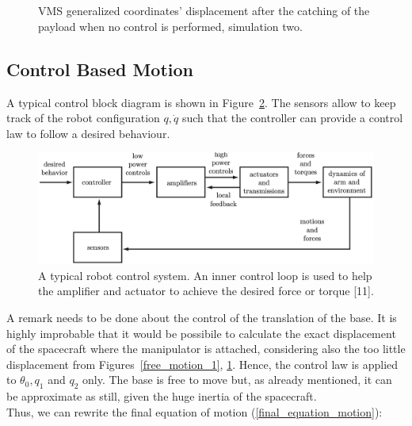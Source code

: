 \documentclass[a4paper,12pt,oneside]{report}
\begin{document}
\begin{figure}[!htb]
  \centering
  \subfloat
  {}\quad
\subfloat
  {} \\
  \subfloat
  {}\quad
  \subfloat
  {}\\
  \subfloat
  {}
  \caption{VMS generalized coordinates' displacement after the catching of the payload when no control is performed, simulation two.}
  \label{free_motion_2}
\end{figure}
\newpage
\FloatBarrier
\subsection{Control Based Motion}\label{control_motion}
A typical control block diagram is shown in Figure~\ref{block_diagram}. The sensors allow to keep track of the robot configuration $q,\dot{q}$ such that the controller can provide a control law to follow a desired behaviour.\\
\begin{figure}[b]
  \centering
  \includegraphics[scale=0.4]{control_diagram.png}
  \caption{A typical robot control system. An inner control loop is used to help the amplifier and actuator to achieve the desired force or torque [11].}
  \label{block_diagram}
\end{figure}
A remark needs to be done about the control of the translation of the base. It is highly improbable that it would be possibile to calculate the exact displacement of the spacecraft where the manipulator is attached, considering also the too little displacement from Figures~\ref{free_motion_1}, \ref{free_motion_2}. Hence, the control law is applied to $\theta_0, q_1$ and $q_2$ only. The base is free to move but, as already mentioned, it can be approximate as still, given the huge inertia of the spacecraft.\\ 
Thus, we can rewrite the final equation of motion (\ref{final_equation_motion}):
\end{document}
